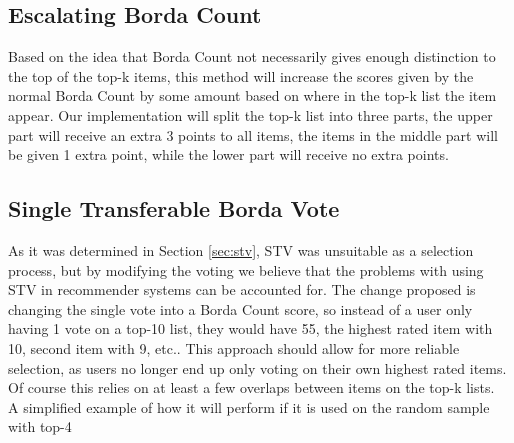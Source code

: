 \subsection{Escalating Borda Count}
Based on the idea that Borda Count not necessarily gives enough distinction to the top of the top-k items, this method will increase the scores given by the normal Borda Count by some amount based on where in the top-k list the item appear. Our implementation will split the top-k list into three parts, the upper part will receive an extra 3 points to all items, the items in the middle part will be given 1 extra point, while the lower part will receive no extra points.


\subsection{Single Transferable Borda Vote} \label{STBV}
As it was determined in Section \ref{sec:stv}, STV was unsuitable as a selection process, but by modifying the voting we believe that the problems with using STV in recommender systems can be accounted for. The change proposed is changing the single vote into a Borda Count score, so instead of a user only having 1 vote on a top-10 list, they would have 55, the highest rated item with 10, second item with 9, etc.. This approach should allow for more reliable selection, as users no longer end up only voting on their own highest rated items. Of course this relies on at least a few overlaps between items on the top-k lists.\\

A simplified example of how it will perform if it is used on the random sample with top-4